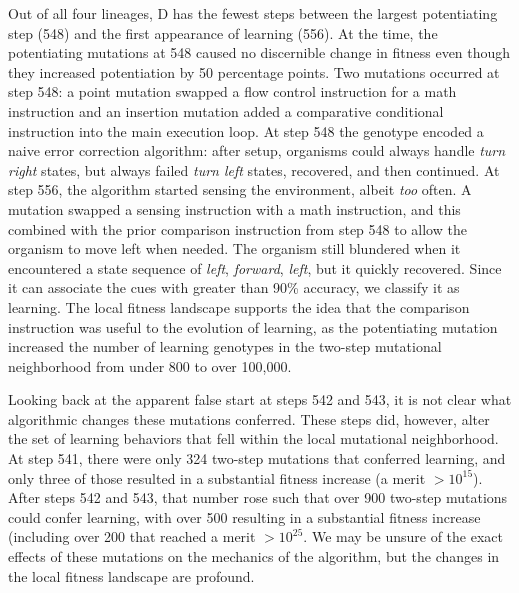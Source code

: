 Out of all four lineages, D has the fewest steps between the largest potentiating step (548) and the first appearance of learning (556).
At the time, the potentiating mutations at 548 caused no discernible change in fitness even though they increased potentiation by 50 percentage points. 
Two mutations occurred at step 548: a point mutation swapped a flow control instruction for a math instruction and an insertion mutation added a comparative conditional instruction into the main execution loop. 
At step 548 the genotype encoded a naive error correction algorithm: after setup, organisms could always handle \textit{turn right} states, but always failed \textit{turn left} states, recovered, and then continued. 
At step 556, the algorithm started sensing the environment, albeit \textit{too} often. 
A mutation swapped a sensing instruction with a math instruction, and this combined with the prior comparison instruction from step 548 to allow the organism to move left when needed. 
The organism still blundered when it encountered a state sequence of \textit{left}, \textit{forward}, \textit{left}, but it quickly recovered. 
Since it can associate the cues with greater than 90\% accuracy, we classify it as learning. 
The local fitness landscape supports the idea that the comparison instruction was useful to the evolution of learning, as the potentiating mutation increased the number of learning genotypes in the two-step mutational neighborhood from under 800 to over 100,000.

Looking back at the apparent false start at steps 542 and 543, it is not clear what algorithmic changes these mutations conferred.
These steps did, however, alter the set of learning behaviors that fell within the local mutational neighborhood. 
At step 541, there were only 324 two-step mutations that conferred learning, and only three of those resulted in a substantial fitness increase (a merit $> 10^{15}$). %
After steps 542 and 543, that number rose such that over 900 two-step mutations could confer learning, with over 500 resulting in a substantial fitness increase (including over 200 that reached a merit $> 10^{25}$.
We may be unsure of the exact effects of these mutations on the mechanics of the algorithm, but the changes in the local fitness landscape are profound. %
